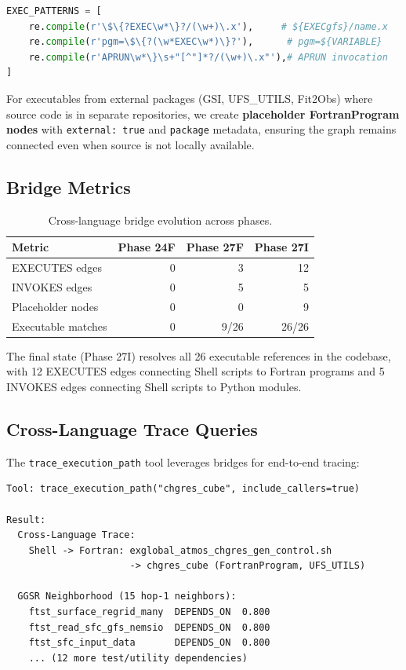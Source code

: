 \documentclass[11pt,letterpaper]{article}
\begin{document}
\begin{lstlisting}[language=Python, caption={Executable detection patterns}]
EXEC_PATTERNS = [
    re.compile(r'\$\{?EXEC\w*\}?/(\w+)\.x'),     # ${EXECgfs}/name.x
    re.compile(r'pgm=\$\{?(\w*EXEC\w*)\}?'),      # pgm=${VARIABLE}
    re.compile(r'APRUN\w*\}\s+"[^"]*?/(\w+)\.x"'),# APRUN invocation
]
\end{lstlisting}

For executables from external packages (GSI, UFS\_UTILS, Fit2Obs) where
source code is in separate repositories, we create
\textbf{placeholder FortranProgram nodes} with \texttt{external: true}
and \texttt{package} metadata, ensuring the graph remains connected even
when source is not locally available.

\subsection{Bridge Metrics}

\begin{table}[H]
\centering
\caption{Cross-language bridge evolution across phases.}
\label{tab:bridges}
\begin{tabular}{@{}lrrr@{}}
\toprule
\textbf{Metric} & \textbf{Phase 24F} & \textbf{Phase 27F} & \textbf{Phase 27I} \\
\midrule
EXECUTES edges     & 0  & 3  & 12 \\
INVOKES edges      & 0  & 5  & 5 \\
Placeholder nodes  & 0  & 0  & 9 \\
Executable matches & 0  & 9/26  & 26/26 \\
\bottomrule
\end{tabular}
\end{table}

The final state (Phase 27I) resolves all 26 executable references in the
codebase, with 12 EXECUTES edges connecting Shell scripts to Fortran
programs and 5 INVOKES edges connecting Shell scripts to Python modules.

\subsection{Cross-Language Trace Queries}

The \texttt{trace\_execution\_path} tool leverages bridges for end-to-end
tracing:

\begin{lstlisting}[language={}, caption={Cross-language trace example}]
Tool: trace_execution_path("chgres_cube", include_callers=true)

Result:
  Cross-Language Trace:
    Shell -> Fortran: exglobal_atmos_chgres_gen_control.sh
                      -> chgres_cube (FortranProgram, UFS_UTILS)

  GGSR Neighborhood (15 hop-1 neighbors):
    ftst_surface_regrid_many  DEPENDS_ON  0.800
    ftst_read_sfc_gfs_nemsio  DEPENDS_ON  0.800
    ftst_sfc_input_data       DEPENDS_ON  0.800
    ... (12 more test/utility dependencies)
\end{lstlisting}
\end{document}
